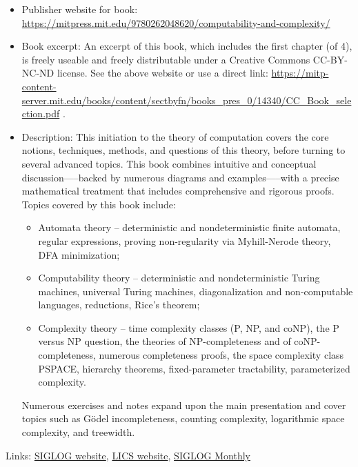 \documentclass[prodmode,acmtecs]{acmsmall} %
\begin{document}
\begin{itemize}\item  Publisher website for book: \href{https://mitpress.mit.edu/9780262048620/computability-and-complexity/}{https://mitpress.mit.edu/9780262048620/computability-and-complexity/} 
 
\item  Book excerpt:  An excerpt of this book, which includes the first chapter (of 4), is freely useable and freely distributable under a Creative Commons CC-BY-NC-ND license.  See the above website or use a direct link: \href{https://mitp-content-server.mit.edu/books/content/sectbyfn/books_pres_0/14340/CC_Book_selection.pdf}{https://mitp-content-server.mit.edu/books/content/sectbyfn/books\_pres\_0/14340/CC\_Book\_selection.pdf} . 
 
\item  Description: This initiation to the theory of computation covers the core notions, techniques, methods, and questions of this theory, before turning to several advanced topics.  This book combines intuitive and conceptual discussion—--backed by numerous diagrams and examples—--with a precise mathematical treatment that includes comprehensive and rigorous proofs.  Topics covered by this book include: 
 
\begin{itemize}\item  Automata theory – deterministic and nondeterministic finite automata, regular expressions, proving non-regularity via Myhill-Nerode theory, DFA minimization;
\item  Computability theory – deterministic and nondeterministic Turing machines, universal Turing machines, diagonalization and non-computable languages, reductions, Rice’s theorem;
\item  Complexity theory – time complexity classes (P, NP, and coNP), the P versus NP question, the theories of NP-completeness and of coNP-completeness, numerous completeness proofs, the space complexity class PSPACE, hierarchy theorems, fixed-parameter tractability, parameterized complexity.
\end{itemize} 
  Numerous exercises and notes expand upon the main presentation and cover topics such as Gödel incompleteness, counting complexity, logarithmic space complexity, and treewidth. 
 
\end{itemize}


\bigskip Links: \href{http://siglog.org/}{SIGLOG website}, \href{https://lics.siglog.org}{LICS website}, \href{https://lics.siglog.org/newsletters/}{SIGLOG Monthly}
\end{document}
